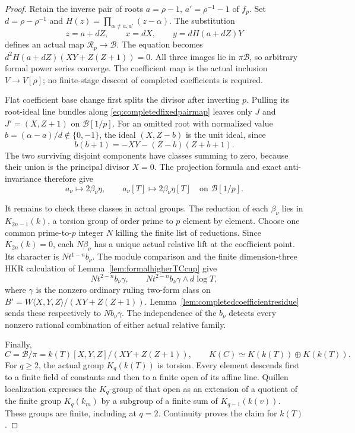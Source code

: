\documentclass[11pt,a4paper]{article}
\theoremstyle{remark}
\begin{document}
\begin{proof}
Retain the inverse pair of roots
$a=\rho-1$, $a'=\rho^{-1}-1$ of $f_p$.
Set $d=\rho-\rho^{-1}$ and
$H(z)=\prod_{\alpha\ne a,a'}(z-\alpha)$.
The substitution
\begin{equation}\label{eq:completedfixedpairmap}
 z=a+dZ,\qquad x=dX,\qquad y=dH(a+dZ)Y
\end{equation}
defines an actual map $\mathcal R_p\to\mathcal B$.
The equation becomes $d^2H(a+dZ)(XY+Z(Z+1))=0$.
All three images lie in $\pi\mathcal B$, so arbitrary formal
power series converge. The coefficient map is the actual
inclusion $V\to V[\rho]$; no finite-stage descent of completed
coefficients is required.

Flat coefficient base change first splits the divisor after
inverting $p$. Pulling its root-ideal line bundles along
\eqref{eq:completedfixedpairmap} leaves only $J$ and
$J'=(X,Z+1)$ on $\mathcal B[1/p]$.
For an omitted root with normalized value
$b=(\alpha-a)/d\notin\{0,-1\}$, the ideal
$(X,Z-b)$ is the unit ideal, since
\[
 b(b+1)=-XY-(Z-b)(Z+b+1).
\]
The two surviving disjoint components have classes summing
to zero, because their union is the principal divisor $X=0$.
The projection formula and exact anti-invariance therefore give
\begin{equation}\label{eq:completedfixedimages}
 a_\nu\longmapsto2\beta_\nu\eta,\qquad
 a_\nu[T]\longmapsto2\beta_\nu\eta[T]
 \quad\text{on }\mathcal B[1/p].
\end{equation}

It remains to check these classes in actual groups.
The reduction of each $\beta_\nu$ lies in
$K_{2n-1}(k)$, a torsion group of order prime to $p$
element by element. Choose one common prime-to-$p$ integer
$N$ killing the finite list of reductions.
Since $K_{2n}(k)=0$, each $N\beta_\nu$ has a unique actual
relative lift at the coefficient point.
Its character is $Nt^{1-n}b_\nu$.
The module comparison and the finite dimension-three HKR
calculation of Lemma~\ref{lem:formalhigherTCcup} give
\[
 Nt^{2-n}b_\nu\gamma,\qquad
 Nt^{2-n}b_\nu\gamma\wedge d\log T,
\]
where $\gamma$ is the nonzero ordinary ruling two-form class
on $B'=W\langle X,Y,Z\rangle/(XY+Z(Z+1))$.
Lemma~\ref{lem:completedcoefficientresidue} sends these
respectively to $Nb_\nu\gamma$.
The independence of the $b_\nu$ detects every nonzero
rational combination of either actual relative family.

Finally,
\[
 C=\mathcal B/\pi
   =k(T)[X,Y,Z]/(XY+Z(Z+1)),\qquad
 K(C)\simeq K(k(T))\oplus K(k(T)).
\]
For $q\geq2$, the actual group $K_q(k(T))$ is torsion.
Every element descends first to a finite field of constants
and then to a finite open of its affine line.
Quillen localization expresses the $K_q$-group of that open
as an extension of a quotient of the finite group $K_q(k_m)$
by a subgroup of a finite sum of $K_{q-1}(k(v))$.
These groups are finite, including at $q=2$.
Continuity proves the claim for $k(T)$.


\end{proof}
\end{document}
